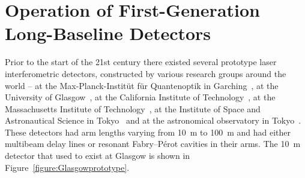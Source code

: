 \section{Operation of First-Generation Long-Baseline Detectors}
\label{section:construction} 

Prior to the start of the 21st century there existed several prototype
laser interferometric detectors, constructed by various research groups around
the world -- at the Max-Planck-Instit\"ut f\"ur Quantenoptik in
Garching~\cite{Shoemaker}, at the University of Glasgow~\cite{Robertson}, at the
California Institute of Technology~\cite{Abramovici}, at the Massachusetts
Institute of Technology~\cite{Fritschel2}, at the Institute of Space and
Astronautical Science in Tokyo~\cite{Mizuno} and at the astronomical observatory
in Tokyo~\cite{Araya}. These detectors had arm lengths varying from 10~m to
100~m and had either multibeam delay lines or resonant Fabry--P\'{e}rot cavities in
their arms. The 10~m detector that used to exist at Glasgow is shown in
Figure~\ref{figure:Glasgowprototype}.
